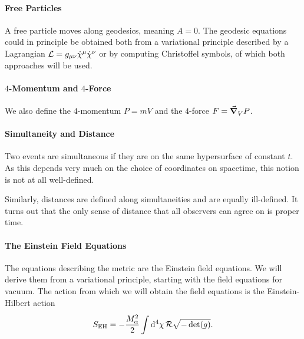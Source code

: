 \paragraph{Free Particles}
A free particle moves along geodesics, meaning $A = 0$. The geodesic equations could in principle be obtained both from a variational principle described by a Lagrangian $\mathcal{L} = g_{\mu\nu}\dot{\chi}^{\mu}\dot{\chi}^{\nu}$ or by computing Christoffel symbols, of which both approaches will be used.

\paragraph{$4$-Momentum and $4$-Force}
We also define the $4$-momentum $P = mV$ and the $4$-force $F = \grad_{V}^{}{P}$.

\paragraph{Simultaneity and Distance}
Two events are simultaneous if they are on the same hypersurface of constant $t$. As this depends very much on the choice of coordinates on spacetime, this notion is not at all well-defined.

Similarly, distances are defined along simultaneities and are equally ill-defined. It turns out that the only sense of distance that all observers can agree on is proper time.

\paragraph{The Einstein Field Equations}
The equations describing the metric are the Einstein field equations. We will derive them from a variational principle, starting with the field equations for vacuum. The action from which we will obtain the field equations is the Einstein-Hilbert action
\begin{align*}
	S_{\text{EH}} = -\frac{M_{\alpha}^{2}}{2}\int\limits_{}^{}\dd[4]{\chi}\mathcal{R}\sqrt{-\det(g)}.
\end{align*}

